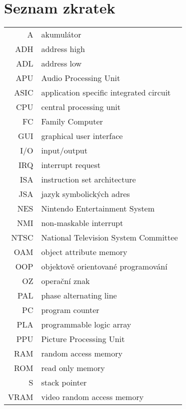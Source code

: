 \documentclass[czech,bachelor,unicode]{ctufit-thesis}
\theoremstyle{plain}
\theoremstyle{definition}
\theoremstyle{remark}
\numberwithin{theorem}{chapter}
\begin{document}
\chapter{Seznam zkratek}
\begin{tabular}{rl}
A 	 & akumulátor \\
ADH &	 address high \\
ADL &	 address low \\
APU &	 Audio Processing Unit\\
ASIC &	 application specific integrated circuit \\
CPU &	 central processing unit\\
FC &	 Family Computer\\
GUI &	 graphical user interface \\
I/O &	 input/output \\
IRQ &	 interrupt request\\
ISA &	 instruction set architecture\\
JSA &	 jazyk symbolických adres\\
NES &	 Nintendo Entertainment System\\
NMI &	 non-maskable interrupt\\
NTSC &	 National Television System Committee\\
OAM &	 object attribute memory\\
OOP &	 objektově orientované programování \\
OZ &	 operační znak \\
PAL &	 phase alternating line\\
PC &	 program counter \\
PLA &	 programmable logic array \\
PPU &	 Picture Processing Unit\\
RAM &	 random access memory\\
ROM &	 read only memory\\
S &	 stack pointer \\
VRAM &	 video random access memory \\

\end{tabular}

\mainmatter\mainmatterinit %



\appendix\appendixinit %


\backmatter %

\printbibliography %

\end{document}
